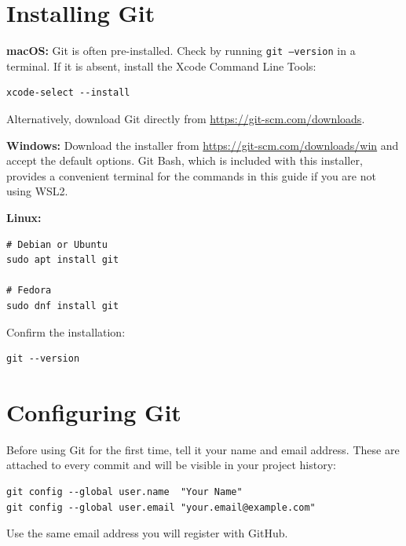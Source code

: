 \documentclass[nobib]{tufte-book}
\begin{document}
\section{Installing Git}

\noindent\textbf{macOS:}
Git is often pre-installed.
Check by running \texttt{git --version} in a terminal.
If it is absent, install the Xcode Command Line Tools:

\begin{lstlisting}[style=bashstyle]
xcode-select --install
\end{lstlisting}

Alternatively, download Git directly from \url{https://git-scm.com/downloads}.

\medskip
\noindent\textbf{Windows:}
Download the installer from \url{https://git-scm.com/downloads/win} and
accept the default options.
Git Bash, which is included with this installer, provides a convenient
terminal for the commands in this guide if you are not using WSL2.

\medskip
\noindent\textbf{Linux:}
\begin{lstlisting}[style=bashstyle]
# Debian or Ubuntu
sudo apt install git

# Fedora
sudo dnf install git
\end{lstlisting}

Confirm the installation:
\begin{lstlisting}[style=bashstyle]
git --version
\end{lstlisting}

\section{Configuring Git}

Before using Git for the first time, tell it your name and email address.
These are attached to every commit and will be visible in your project
history:

\begin{lstlisting}[style=bashstyle]
git config --global user.name  "Your Name"
git config --global user.email "your.email@example.com"
\end{lstlisting}

Use the same email address you will register with GitHub.
\end{document}
